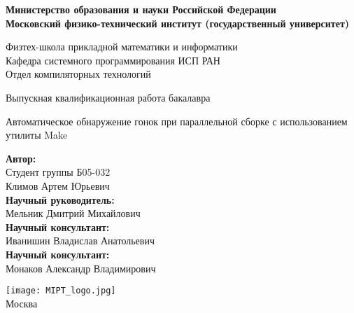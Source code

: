 \begin{center}
    \large\textbf{Министерство образования и науки Российской Федерации \\
    Московский физико-технический институт (государственный
    университет)} \\
    \vspace{1cm}

    Физтех-школа прикладной математики и информатики \\

    Кафедра системного программирования ИСП РАН \\
    Отдел компиляторных технологий\\

    \vspace{3em}

    Выпускная квалификационная работа бакалавра
\end{center}

\begin{center}
    \vspace{\fill}
    \LARGE{Автоматическое обнаружение гонок при параллельной сборке с использованием утилиты Make}

    \vspace{\fill}
\end{center}


\begin{flushright}
    \textbf{Автор:} \\
    Студент группы Б05-032 \\
    Климов Артем Юрьевич \\
    \vspace{2em}
    \textbf{Научный руководитель:} \\
    Мельник Дмитрий Михайлович \\
    \vspace{2em}
    \textbf{Научный консультант:} \\
    Иванишин Владислав Анатольевич \\
    \vspace{2em}
    \textbf{Научный консультант:} \\
    Монаков Александр Владимирович \\
\end{flushright}

\vspace{7em}

\begin{center}
    \texttt{[image: MIPT\_logo.jpg]}\\
    Москва \the\year{}
\end{center}

\thispagestyle{empty}

\newpage
\setcounter{page}{2}
\fancyfoot[c]{\thepage}
\fancyhead[R]{}